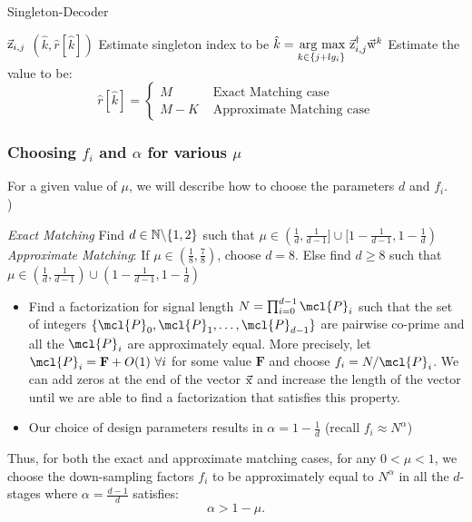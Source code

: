 \begin{algorithm}[h!]
\caption{Singleton-Decoder}
\label{Algo:SingletonDecoder}
\begin{algorithmic}
 $\vec{\mathrm{z}}_{i,j}$
\vspace{\gap}
 $(\hat{k},\hat{r}[\hat{k}])$
\vspace{\gap}
\State Estimate singleton index to be $ \hat{k} = \underset{k\in\{j+l g_i\}}{\operatorname*{\,arg\ max}}\  \vec{\mathrm{z}}^{\dagger}_{i,j} \vec{\mathrm{w}}^{k}$
\vspace{\gap}
  \State Estimate the value to be:$$ \hat{r}[\hat{k}]=
   \begin{cases}
   M & \text{ Exact Matching case}\\
  M-K & \text{ Approximate Matching case}
  \end{cases}
  $$
\end{algorithmic}
\end{algorithm}

\subsubsection{Choosing $f_i$ and $\alpha$ for various $\mu$}
\label{subsec:DesignParameters}

For a given value of $\mu$, we will describe how to choose the parameters $d$ and $f_i$.\\
 {\color{blue}{(Change the choice of parameters to account for the new bound $\alpha > 1- \mu$})}

 {\it Exact Matching} Find $d\in \mathbb{N}\backslash \{1,2\}$ such that $\mu\in(\frac{1}{d},\frac{1}{d-1}]\cup[1-\frac{1}{d-1},1-\frac{1}{d})$\\
{\it Approximate Matching}: If $\mu\in(\frac{1}{8},\frac{7}{8})$, choose $d=8$. Else find $d\geq 8$ such that $\mu\in(\frac{1}{d},\frac{1}{d-1})\cup(1-\frac{1}{d-1},1-\frac{1}{d})$
\begin{itemize}
\item Find a factorization for signal length $N=\prod_{i=0}^{d-1} \mcl{P}_i$ such that the set of integers $\{\mcl{P}_0,\mcl{P}_1,\ldots,\mcl{P}_{d-1}\}$ are pairwise co-prime and all the $\mcl{P}_i$ are approximately equal. More precisely, let $\mcl{P}_i=\mathbf{F}+O(1) ~\forall i$ for some value $\mathbf{F}$ and choose $f_i=N/\mcl{P}_i$. We can add zeros at the end of the vector $\vec{\mathrm{x}}$ and increase the length of the vector until we are able to find a factorization that satisfies this property.
\item Our choice of design parameters results in $\alpha=1-\frac{1}{d}$ (recall $f_i\approx N^{\alpha}$)
\end{itemize}
Thus, for both the exact and approximate matching cases, for any $0<\mu<1$, we choose the down-sampling factors $f_i$ to be approximately equal to $N^{\alpha}$ in all the $d$-stages where $\alpha=\frac{d-1}{d}$ satisfies:
\begin{equation}
\label{Eqn:IneqMuAlpha}
\alpha>1-\mu.
\end{equation}

